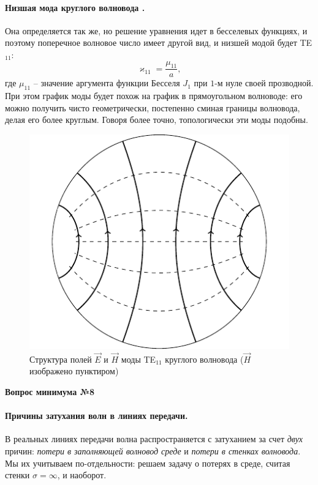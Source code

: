\documentclass[a4paper,14pt]{extarticle}
\newcommand{\ticket}[1] {
\newpage
\hypertarget{num#1}{}
\begin{center}
	\textbf{Вопрос минимума №#1 }
\end{center}
}
\begin{document}
\paragraph{Низшая мода круглого волновода .} Она определяется так же, но решение уравнения идет в бесселевых функциях, и поэтому поперечное волновое число имеет другой вид, и низшей модой будет TE${}_{11}$:
\begin{equation}
	\varkappa_{11}=\frac{\mu_{11}}{a},
\end{equation}
где $\mu_{11}$ -- значение аргумента функции Бесселя $J_1$ при   $1$-м нуле своей прозводной. При этом график моды будет похож на график в прямоугольном волноводе: его можно получить чисто геометрически, постепенно сминая границы волновода, делая его более круглым. Говоря более точно, топологически эти моды подобны.
\begin{figure}[H]
	\centering
	\includegraphics[scale=1.5]{img_lect5/cylindric/TE11.pdf}
	\caption{Структура полей $\vec{E}$ и $\vec{H}$ моды TE${}_{11}$ круглого волновода ($\vec{H}$ изображено пунктиром)}
	\label{fig:lect4:8}
\end{figure}




\ticket{8}
\paragraph{Причины затухания волн в линиях передачи.} В реальных линиях передачи волна распространяется с затуханием за счет \textit{двух} причин: \textit{потери в заполняющей волновод среде} и \textit{потери в стенках волновода}. Мы их учитываем по-отдельности: решаем задачу о потерях в среде, считая стенки $\sigma=\infty$, и наоборот.
\end{document}

